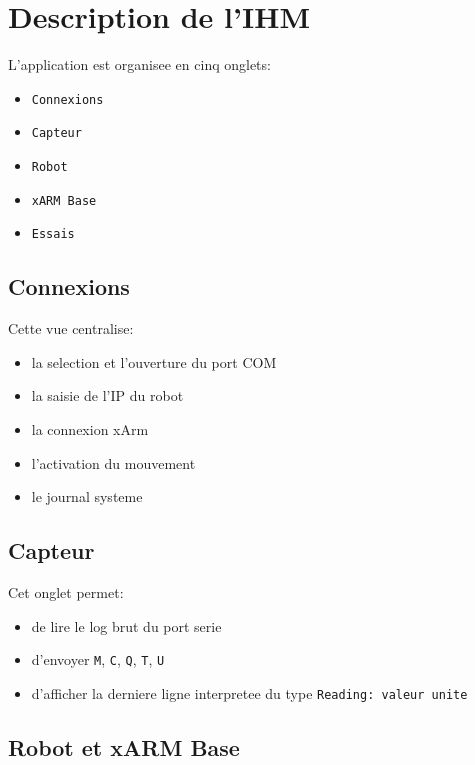 \documentclass[11pt,a4paper]{article}
\begin{document}
\section{Description de l'IHM}

L'application est organisee en cinq onglets:

\begin{itemize}
    \item \texttt{Connexions}
    \item \texttt{Capteur}
    \item \texttt{Robot}
    \item \texttt{xARM Base}
    \item \texttt{Essais}
\end{itemize}

\subsection{Connexions}

Cette vue centralise:

\begin{itemize}
    \item la selection et l'ouverture du port COM
    \item la saisie de l'IP du robot
    \item la connexion xArm
    \item l'activation du mouvement
    \item le journal systeme
\end{itemize}

\subsection{Capteur}

Cet onglet permet:

\begin{itemize}
    \item de lire le log brut du port serie
    \item d'envoyer \texttt{M}, \texttt{C}, \texttt{Q}, \texttt{T}, \texttt{U}
    \item d'afficher la derniere ligne interpretee du type \texttt{Reading: valeur unite}
\end{itemize}

\subsection{Robot et xARM Base}
\end{document}
